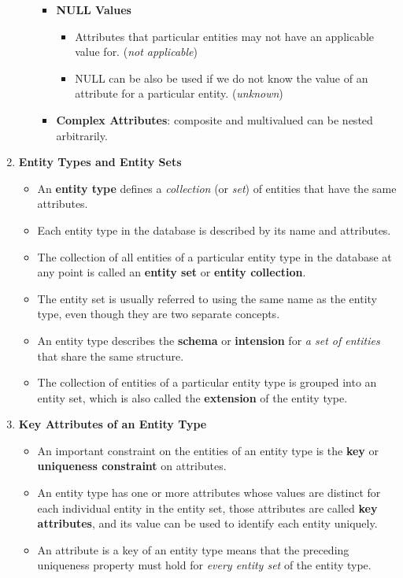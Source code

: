 \documentclass[10pt]{article}
\begin{document}
\begin{enumerate}
\begin{itemize}
\begin{itemize}
			\item \textbf{NULL Values}
			\begin{itemize}
				\item Attributes that particular entities may not have an applicable value for. (\textit{not applicable})
				\item NULL can be also be used if we do not know the value of an attribute for a particular entity. (\textit{unknown}) 
			\end{itemize}

			\item \textbf{Complex Attributes}: composite and multivalued can be nested arbitrarily.
		\end{itemize}
	\end{itemize}
	\item \textbf{Entity Types and Entity Sets}
	\begin{itemize}
		\item An \textbf{entity type} defines a \textit{collection} (or \textit{set}) of entities that have the same attributes.
		\item Each entity type in the database is described by its name and attributes.
		\item The collection of all entities of a particular entity type in the database at any point is called an \textbf{entity set} or \textbf{entity collection}.
		\item The entity set is usually referred to using the same name as the entity type, even though they are two separate concepts.
		\item An entity type describes the \textbf{schema} or \textbf{intension} for \textit{a set of entities} that share the same structure.
		\item The collection of entities of a particular entity type is grouped into an entity set, which is also called the \textbf{extension} of the entity type.
	\end{itemize}

	\item \textbf{Key Attributes of an Entity Type}
	\begin{itemize}
		\item An important constraint on the entities of an entity type is the \textbf{key} or \textbf{uniqueness constraint} on attributes.
		\item An entity type has one or more attributes whose values are distinct for each individual entity in the entity set, those attributes are called \textbf{key attributes}, and its value can be used to identify each entity uniquely.
		\item An attribute is a key of an entity type means that the preceding uniqueness property must hold for \textit{every entity set} of the entity type.   
	\end{itemize}


\end{enumerate}
\end{document}

